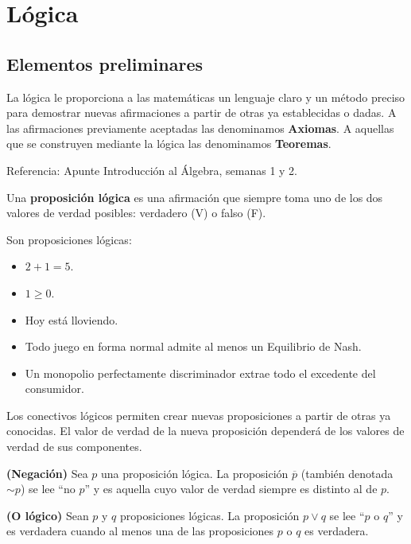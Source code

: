 
\section{Lógica}

\subsection{Elementos preliminares}

La lógica le proporciona a las matemáticas un lenguaje claro y un método preciso para demostrar nuevas afirmaciones a partir de otras ya establecidas o dadas. A las afirmaciones previamente aceptadas las denominamos \textbf{Axiomas}. A aquellas que se construyen mediante la lógica las denominamos \textbf{Teoremas}. 

Referencia: Apunte Introducción al Álgebra, semanas 1 y 2. 

\begin{definicion}
	Una \textbf{proposición lógica} es una afirmación que siempre toma uno de los dos valores de verdad posibles: verdadero (V) o falso (F). 
\end{definicion}

\begin{ejemplo}
	Son proposiciones lógicas: 
	\begin{itemize}
		\item $2+1 = 5$. 
		\item $1 \geq 0$.
		\item Hoy está lloviendo. 
		\item Todo juego en forma normal admite al menos un Equilibrio de Nash.   
		\item Un monopolio perfectamente discriminador extrae todo el excedente del consumidor. 
	\end{itemize}
\end{ejemplo}

Los conectivos lógicos permiten crear nuevas proposiciones a partir de otras ya conocidas. El valor de verdad de la nueva proposición dependerá de los valores de verdad de sus componentes. 

\begin{definicion}
	\textbf{(Negación)} 
	Sea $p$ una proposición lógica. La proposición $\overline{p}$ (también denotada $\sim p$) se lee ``no $p$'' y es aquella cuyo valor de verdad siempre es distinto al de $p$. 
\end{definicion}

\begin{definicion}
	\textbf{(O lógico)}	
	Sean $p$ y $q$ proposiciones lógicas. La proposición $p \vee q$ se lee ``$p$ o $q$'' y es verdadera cuando al menos una de las proposiciones $p$ o $q$ es verdadera. 
\end{definicion}

